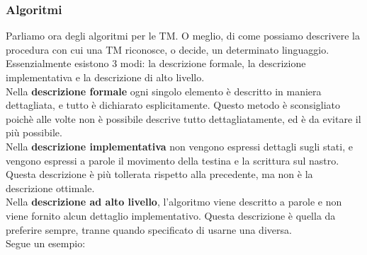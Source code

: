 \documentclass[]{article}
\begin{document}
			\subsubsection{Algoritmi}
				Parliamo ora degli algoritmi per le TM. O meglio, di come possiamo descrivere la procedura con cui una TM riconosce, o decide, un determinato linguaggio.\\
				Essenzialmente esistono 3 modi: la descrizione formale, la descrizione implementativa e la descrizione di alto livello.\\
				Nella \textbf{descrizione formale} ogni singolo elemento è descritto in maniera dettagliata, e tutto è dichiarato esplicitamente. Questo metodo è sconsigliato poichè alle volte non è possibile descrive tutto dettagliatamente, ed è da evitare il più possibile.\\
				Nella \textbf{descrizione implementativa} non vengono espressi dettagli sugli stati, e vengono espressi a parole il movimento della testina e la scrittura sul nastro. Questa descrizione è più tollerata rispetto alla precedente, ma non è la descrizione ottimale.\\
				Nella \textbf{descrizione ad alto livello}, l'algoritmo viene descritto a parole e non viene fornito alcun dettaglio implementativo. Questa descrizione è quella da preferire sempre, tranne quando specificato di usarne una diversa.\\
				Segue un esempio:
\end{document}

